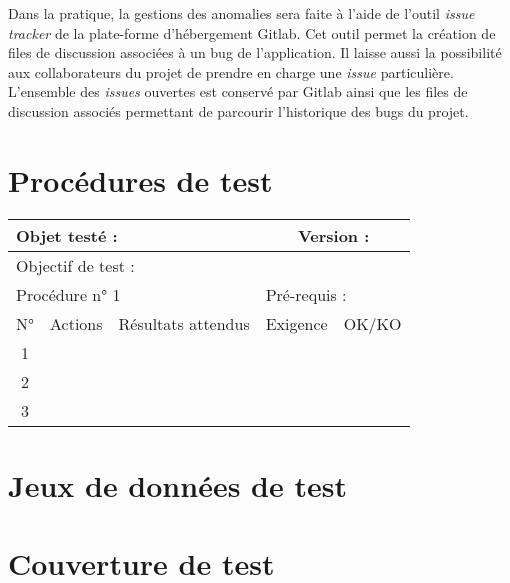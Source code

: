 \documentclass{../res/univ-projet}
\begin{document}
  Dans la pratique, la gestions des anomalies sera faite à l'aide de l'outil \emph{issue tracker} de
  la plate-forme d'hébergement Gitlab. Cet outil permet la création de files de discussion associées à un bug
  de l'application. Il laisse aussi la possibilité aux collaborateurs du projet de prendre en charge 
  une \emph{issue} particulière. L'ensemble des \emph{issues} ouvertes est conservé par Gitlab ainsi
  que les files de discussion associés permettant de parcourir l'historique des bugs du projet.


\section{Procédures de test}

\begin{center}
    \begin{tabular}{|c|p{5cm}|p{5cm}|p{1.5cm}|p{1.5cm}|}
      \hline
      \multicolumn{3}{|l|}{Objet testé : } & \multicolumn{2}{c|}{Version : }\\ \hline
      \multicolumn{5}{|l|}{Objectif de test : }\\ \hline
      \multicolumn{3}{|l|}{Procédure n° 1} & \multicolumn{2}{p{3cm}|}{Pré-requis : }\\ \hline
      \multicolumn{1}{|c|}{N°} & \multicolumn{1}{c|}{Actions} & \multicolumn{1}{c|}{Résultats attendus} & 
      \multicolumn{1}{c|}{Exigence} & \multicolumn{1}{c|}{OK/KO}\\ \hline
      1 &  &  &  & \\
      2 &  &  &  & \\
      3 &  &  &  & \\ \hline
    \end{tabular}
    \vfill
\end{center}

\section{Jeux de données de test}

\section{Couverture de test}
\end{document}
